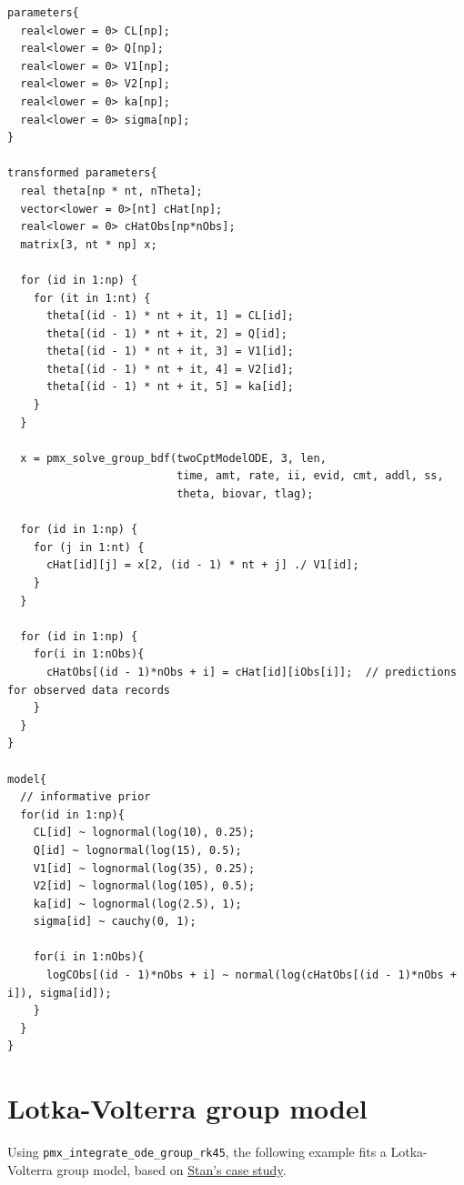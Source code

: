 \documentclass[10pt, reqno, oneside]{amsbook}
\numberwithin{equation}{chapter}
\numberwithin{figure}{chapter}
\numberwithin{table}{chapter}
\theoremstyle{remark}
\begin{document}
\begin{verbatim}
parameters{
  real<lower = 0> CL[np];
  real<lower = 0> Q[np];
  real<lower = 0> V1[np];
  real<lower = 0> V2[np];
  real<lower = 0> ka[np];
  real<lower = 0> sigma[np];
}

transformed parameters{
  real theta[np * nt, nTheta];
  vector<lower = 0>[nt] cHat[np];
  real<lower = 0> cHatObs[np*nObs];
  matrix[3, nt * np] x; 

  for (id in 1:np) {
    for (it in 1:nt) {
      theta[(id - 1) * nt + it, 1] = CL[id];
      theta[(id - 1) * nt + it, 2] = Q[id];
      theta[(id - 1) * nt + it, 3] = V1[id];
      theta[(id - 1) * nt + it, 4] = V2[id];
      theta[(id - 1) * nt + it, 5] = ka[id];
    }
  }

  x = pmx_solve_group_bdf(twoCptModelODE, 3, len,
                          time, amt, rate, ii, evid, cmt, addl, ss,
                          theta, biovar, tlag);

  for (id in 1:np) {
    for (j in 1:nt) {
      cHat[id][j] = x[2, (id - 1) * nt + j] ./ V1[id];
    }
  }

  for (id in 1:np) {
    for(i in 1:nObs){
      cHatObs[(id - 1)*nObs + i] = cHat[id][iObs[i]];  // predictions for observed data records
    }
  }
}

model{
  // informative prior
  for(id in 1:np){
    CL[id] ~ lognormal(log(10), 0.25);
    Q[id] ~ lognormal(log(15), 0.5);
    V1[id] ~ lognormal(log(35), 0.25);
    V2[id] ~ lognormal(log(105), 0.5);
    ka[id] ~ lognormal(log(2.5), 1);
    sigma[id] ~ cauchy(0, 1);

    for(i in 1:nObs){
      logCObs[(id - 1)*nObs + i] ~ normal(log(cHatObs[(id - 1)*nObs + i]), sigma[id]);
    }
  }
}
\end{verbatim}

\section{Lotka-Volterra group model}
\label{sec:orga4e9032}
Using \texttt{pmx\_integrate\_ode\_group\_rk45}, the following example fits
a Lotka-Volterra group model, based on \href{https://mc-stan.org/users/documentation/case-studies/lotka-volterra-predator-prey.html}{Stan's case study}.
\end{document}
